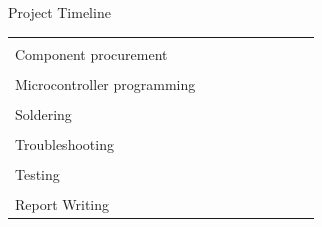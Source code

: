 \documentclass[aspectratio=169]{beamer}
\begin{document}
\begin{frame}{Project Timeline}
\begin{table}[]
\begin{adjustbox}{totalheight=\baselineskip,center}
\begin{tabular}{|l|l|l|l|l|l|l|l|l|}
  \cellcolor[HTML]{6D9EEB} &
   &
   &
   &
   &
   \\ \hline
 &
   &
  \cellcolor[HTML]{93C47D} &
   &
  \cellcolor[HTML]{93C47D} &
   &
   &
   &
   \\ \cline{2-9} 
\multirow{-2}{*}{Component procurement} &
   &
  \cellcolor[HTML]{6D9EEB} &
   &
  \cellcolor[HTML]{6D9EEB} &
   &
   &
   &
   \\ \hline
 &
   &
   &
   &
  \cellcolor[HTML]{93C47D} &
  \cellcolor[HTML]{93C47D} &
  \cellcolor[HTML]{93C47D} &
   &
   \\ \cline{2-9} 
\multirow{-2}{*}{Microcontroller programming} &
   &
   &
   &
   &
  \cellcolor[HTML]{6D9EEB} &
  \cellcolor[HTML]{6D9EEB} &
   &
   \\ \hline
 &
   &
   &
   &
  \cellcolor[HTML]{93C47D} &
  \cellcolor[HTML]{93C47D} &
   &
   &
   \\ \cline{2-9} 
\multirow{-2}{*}{Soldering} &
   &
   &
   &
  \cellcolor[HTML]{6D9EEB} &
  \cellcolor[HTML]{6D9EEB} &
   &
   &
   \\ \hline
 &
   &
   &
   &
  \cellcolor[HTML]{93C47D} &
  \cellcolor[HTML]{93C47D} &
  \cellcolor[HTML]{93C47D} &
   &
   \\ \cline{2-9} 
\multirow{-2}{*}{Troubleshooting} &
   &
   &
   &
  \cellcolor[HTML]{6D9EEB} &
  \cellcolor[HTML]{6D9EEB} &
   &
   &
   \\ \hline
 &
   &
   &
   &
   &
  \cellcolor[HTML]{93C47D} &
  \cellcolor[HTML]{93C47D} &
  \cellcolor[HTML]{93C47D} &
   \\ \cline{2-9} 
\multirow{-2}{*}{Testing} &
   &
   &
   &
   &
  \cellcolor[HTML]{6D9EEB} &
  \cellcolor[HTML]{6D9EEB} &
   &
   \\ \hline
 &
   &
   &
   &
  \cellcolor[HTML]{93C47D} &
  \cellcolor[HTML]{93C47D} &
  \cellcolor[HTML]{93C47D} &
  \cellcolor[HTML]{93C47D} &
  \cellcolor[HTML]{93C47D} \\ \cline{2-9} 
\multirow{-2}{*}{Report Writing} &
   &
   &
   &
  \cellcolor[HTML]{6D9EEB} &
  \cellcolor[HTML]{6D9EEB} &
   &
   &
   \\ \hline
\end{tabular}
				\end{adjustbox}
			\end{table}
		\end{frame}
		
		
		
\end{document}
